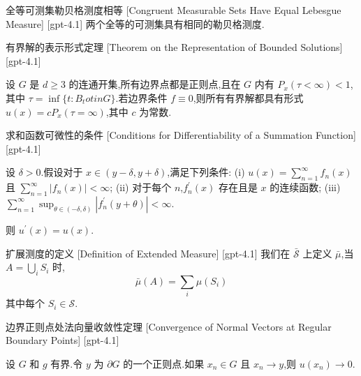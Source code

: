 \documentclass[UTF8]{ctexart}
\begin{document}
    
    
    \begin{ppt}
        {全等可测集勒贝格测度相等}
        [Congruent Measurable Sets Have Equal Lebesgue Measure]
        [gpt-4.1]
        两个全等的可测集具有相同的勒贝格测度.
    \end{ppt}
    
    
    
    \begin{thm}
        {有界解的表示形式定理}
        [Theorem on the Representation of Bounded Solutions]
        [gpt-4.1]
        
设 $G$ 是 $d \geq 3$ 的连通开集,所有边界点都是正则点,且在 $G$ 内有 $P_x(\tau < \infty) < 1$,其中 $\tau = \operatorname{inf}\{ t : B_t 
otin G \}$.若边界条件 $f \equiv 0$,则所有有界解都具有形式 $u(x) = c P_x(\tau = \infty)$,其中 $c$ 为常数.

    \end{thm}
    
    
    
    \begin{thm}
        {求和函数可微性的条件}
        [Conditions for Differentiability of a Summation Function]
        [gpt-4.1]
        
设 $\delta > 0$.假设对于 $x \in (y - \delta, y + \delta)$,满足下列条件:
(i) $u(x) = \sum_{n=1}^{\infty} f_{n}(x)$ 且 $\sum_{n=1}^{\infty} |f_{n}(x)| < \infty$;
(ii) 对于每个 $n$,$f_{n}^{\prime}(x)$ 存在且是 $x$ 的连续函数;
(iii) $\sum_{n=1}^{\infty} \sup_{\theta \in ( -\delta, \delta )} |f_{n}^{\prime}(y + \theta)| < \infty$.

则 $u^{\prime}(x) = 
u(x)$.

    \end{thm}
    
    
    
    \begin{dfn}
        {扩展测度的定义}
        [Definition of Extended Measure]
        [gpt-4.1]
        我们在 $\bar{\mathcal{S}}$ 上定义 $\bar{\mu}$,当 $A = \bigcup_{i} S_{i}$ 时,
\[
\bar{\mu}(A) = \sum_{i} \mu(S_{i})
\]
其中每个 $S_i \in \mathcal{S}$.
    \end{dfn}
    
    
    
    \begin{thm}
        {边界正则点处法向量收敛性定理}
        [Convergence of Normal Vectors at Regular Boundary Points]
        [gpt-4.1]
        
设 $G$ 和 $g$ 有界.令 $y$ 为 $\partial G$ 的一个正则点.如果 $x_n \in G$ 且 $x_n \to y$,则 $
u(x_n) \to 0$.

    \end{thm}
    
\end{document}
